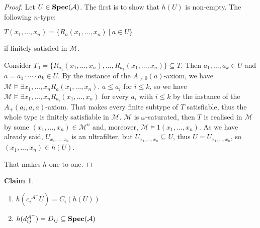 \documentclass{article}
\theoremstyle{defin}
\theoremstyle{theorem}
\theoremstyle{claim}
\newtheorem{claim}{Claim}
\theoremstyle{prop}
\theoremstyle{lemma}
\theoremstyle{fact}
\theoremstyle{remark}
\theoremstyle{ex}
\theoremstyle{col}
\theoremstyle{question}
\begin{document}
\begin{proof}
Let $U \in {\bf Spec}(\mathcal{A})$. The first is to show that $h(U)$ is non-empty. The following $n$-type:
\begin{center}
$T(x_1, \dots, x_n) = \{ R_a(x_1, \dots, x_n) \: | \: a \in U \}$
\end{center}
if finitely satisfied in $\mathcal{M}$.

Consider $T_0 = \{ R_{a_1}(x_1, \dots, x_n), \ldots, R_{a_k}(x_1, \dots, x_n) \} \subseteq T$. 
Then $a_1, \dots, a_k \in U$ and $a = a_1 \cdot \cdots \cdot a_k \in U$. 
By the instance of the $A_{\neq 0}(a)$-axiom,
 we have $\mathcal{M} \models \exists x_1, \dots, x_n R_a(x_1, \dots, x_n)$.
$a \leq a_i$ for $i \leq k$, so we have $\mathcal{M} \models \exists x_1, \dots, x_n R_{a_i}(x_1, \dots, x_n)$ 
for every $a_i$ with $i \leq k$ by the instance of the $A_{+}(a_i, a, a)$-axiom. 
That makes every finite subtype of $T$ satisfiable, thus the whole type is finitely satisfiable in $\mathcal{M}$.
$\mathcal{M}$ is $\omega$-saturated, then $T$ is realised in $\mathcal{M}$ by some $(x_1, \dots, x_n) \in \mathcal{M}^n$ and,
moreover, $\mathcal{M} \models 1(x_1, \dots, x_n)$. As we have already said, $U_{x_1, \dots, x_n}$ is an ultrafilter, 
but $U_{x_1, \dots, x_n} \subseteq U$, thus $U = U_{x_1, \dots, x_n}$, so $(x_1, \dots, x_n) \in h(U)$.

That makes $h$ one-to-one.
\end{proof}

\begin{claim}
$ $

\begin{enumerate}
\item $h(c_i{^{\mathcal{A}^{+}}} U) = C_i (h(U))$
\item $h(d_{ij}^{\mathcal{A}^{+}}) = D_{ij} \subseteq {\bf Spec}(\mathcal{A})$
\end{enumerate}
\end{claim}
\end{document}
